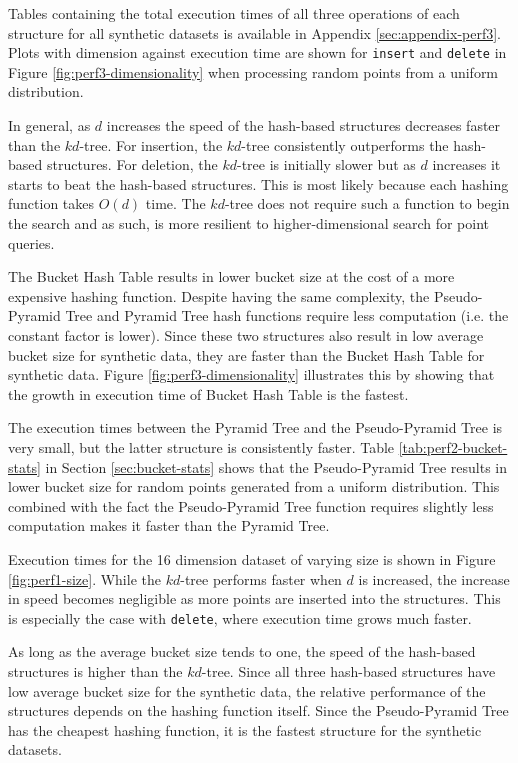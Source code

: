 Tables containing the total execution times of all three operations of each structure for all synthetic datasets is available in Appendix \ref{sec:appendix-perf3}. Plots with dimension against execution time are shown for \texttt{insert} and \texttt{delete} in Figure \ref{fig:perf3-dimensionality} when processing random points from a uniform distribution.

In general, as $d$ increases the speed of the hash-based structures decreases faster than the $kd$-tree. For insertion, the $kd$-tree consistently outperforms the hash-based structures. For deletion, the $kd$-tree is initially slower but as $d$ increases it starts to beat the hash-based structures. This is most likely because each hashing function takes $O(d)$ time. The $kd$-tree does not require such a function to begin the search and as such, is more resilient to higher-dimensional search for point queries.

The Bucket Hash Table results in lower bucket size at the cost of a more expensive hashing function. Despite having the same complexity, the Pseudo-Pyramid Tree and Pyramid Tree hash functions require less computation (i.e. the constant factor is lower). Since these two structures also result in low average bucket size for synthetic data, they are faster than the Bucket Hash Table for synthetic data. Figure \ref{fig:perf3-dimensionality} illustrates this by showing that the growth in execution time of Bucket Hash Table is the fastest. 

The execution times between the Pyramid Tree and the Pseudo-Pyramid Tree is very small, but the latter structure is consistently faster. Table \ref{tab:perf2-bucket-stats} in Section \ref{sec:bucket-stats} shows that the Pseudo-Pyramid Tree results in lower bucket size for random points generated from a uniform distribution. This combined with the fact the Pseudo-Pyramid Tree function requires slightly less computation makes it faster than the Pyramid Tree.

Execution times for the 16 dimension dataset of varying size is shown in Figure \ref{fig:perf1-size}. While the $kd$-tree performs faster when $d$ is increased, the increase in speed becomes negligible as more points are inserted into the structures. This is especially the case with \texttt{delete}, where execution time grows much faster.

As long as the average bucket size tends to one, the speed of the hash-based structures is higher than the $kd$-tree. Since all three hash-based structures have low average bucket size for the synthetic data, the relative performance of the structures depends on the hashing function itself. Since the Pseudo-Pyramid Tree has the cheapest hashing function, it is the fastest structure for the synthetic datasets.

